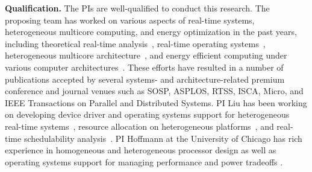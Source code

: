 \vspace{2mm} \noindent \textbf{Qualification.} The PIs are
well-qualified to conduct this research. The proposing team has worked
on various aspects of real-time systems, heterogeneous multicore
computing, and energy optimization in the past years, including
theoretical real-time analysis~\cite{Liu1, Liu2, Liu6, Liu7, Liu10,
  liu2014supporting, Liu3, Liu4, Liu5, Liu9, Liu11, Liu13,
  chen2015k2u}, real-time operating systems~\cite{elliott1minimizing,
  Liu12, GPES, zhou2015supporting, Zhou2014a}, heterogeneous multicore
architecture~\cite{Zhou2014a, GPES}, and energy efficient computing
under various computer architectures~\cite{Liu12}. These efforts have
resulted in a number of publications accepted by several systems- and
architecture-related premium conference and journal venues such as
SOSP, ASPLOS, RTSS, ISCA, Micro, and IEEE Transactions on Parallel and
Distributed Systems.  PI Liu has been working on developing device
driver and operating systems support for heterogeneous real-time
systems~\cite{GPES, zhou2015supporting, Zhou2014a}, resource
allocation on heterogeneous platforms~\cite{Tong14a, LiuRTSS14a,
  chen2015k2u, Liu12, elliott1minimizing}, and real-time
schedulability analysis~\cite{Liu1, Liu2, Liu6, Liu7, Liu10,
  liu2014supporting, LiuRTSS14b, Liu3, Liu4, Liu5, Liu9, Liu11,
  Liu13}.  PI Hoffmann at the University of Chicago has rich experience
in homogeneous\cite{raw1,raw2,raw3,tilera1,tilera2} and
heterogeneous \cite{ASAP,HPEC,ASAP2,ISSoC} processor design as well
as operating systems support for managing performance and power
tradeoffs
\cite{LEO,POET,DynamicKnobs,JouleGuard,PTRADE,PCP,TCST,HotPower,kim-cpsna}.
